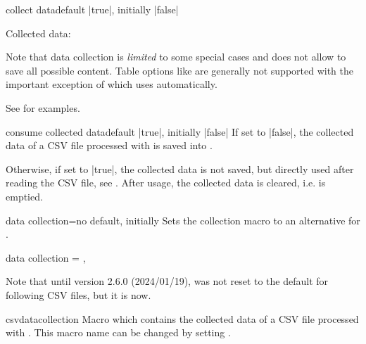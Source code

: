 \documentclass[a4paper,11pt]{ltxdoc}
\begin{document}
\begin{docCsvKey}[][doc new and updated={2021-07-06}{2023-10-17}]{collect data}{}{default |true|, initially |false|}
\begin{dispExample}
Collected data:\par
\csvdatacollection
\end{dispExample}

Note that data collection is \emph{limited} to some special cases and does not
allow to save all possible content. Table options like 
are generally not supported with the important exception of 
which uses  automatically.\par
See  for examples.
\end{docCsvKey}

\clearpage

\begin{docCsvKey}[][doc new={2023-12-18}]{consume collected data}{}{default |true|, initially |false|}
If set to |false|, the collected data of a CSV file processed with
 is saved into .\par
Otherwise, if set to |true|, the collected data is not saved, but directly used
after reading the CSV file, see .
After usage, the collected data is cleared, i.e.  is emptied.
\end{docCsvKey}


\begin{docCsvKey}[][doc new and updated={2021-07-06}{2024-05-16}]{data collection}{=}{no default, initially }
Sets the collection macro to an alternative for .
\begin{dispListing}
  data collection = \myData,    %
\end{dispListing}
Note that until version 2.6.0 (2024/01/19),  was
not reset to the default  for following CSV files,
but it is now.
\end{docCsvKey}


\begin{docCommand}[doc new=2021-07-06]{csvdatacollection}{}
  Macro which contains the collected data of a CSV file processed with
  . This macro name can be changed by
  setting .
\end{docCommand}
\end{document}
